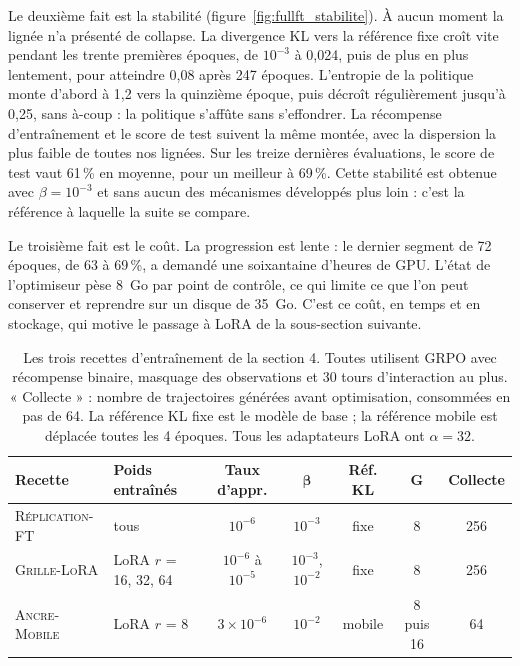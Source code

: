 \documentclass[11pt,a4paper]{article}
\begin{document}
Le deuxième fait est la stabilité (figure~\ref{fig:fullft_stabilite}). À aucun moment la lignée n'a présenté de collapse. La divergence KL vers la référence fixe croît vite pendant les trente premières époques, de $10^{-3}$ à 0{,}024, puis de plus en plus lentement, pour atteindre 0{,}08 après 247 époques. L'entropie de la politique monte d'abord à 1{,}2 vers la quinzième époque, puis décroît régulièrement jusqu'à 0{,}25, sans à-coup : la politique s'affûte sans s'effondrer. La récompense d'entraînement et le score de test suivent la même montée, avec la dispersion la plus faible de toutes nos lignées. Sur les treize dernières évaluations, le score de test vaut 61\,\% en moyenne, pour un meilleur à 69\,\%. Cette stabilité est obtenue avec $\beta = 10^{-3}$ et sans aucun des mécanismes développés plus loin : c'est la référence à laquelle la suite se compare.



Le troisième fait est le coût. La progression est lente : le dernier segment de 72 époques, de 63 à 69\,\%, a demandé une soixantaine d'heures de GPU. L'état de l'optimiseur pèse 8~Go par point de contrôle, ce qui limite ce que l'on peut conserver et reprendre sur un disque de 35~Go. C'est ce coût, en temps et en stockage, qui motive le passage à LoRA de la sous-section suivante.

\begin{table}[htbp]
\centering
\caption{Les trois recettes d'entraînement de la section 4. Toutes utilisent GRPO avec récompense binaire, masquage des observations et 30 tours d'interaction au plus. « Collecte » : nombre de trajectoires générées avant optimisation, consommées en pas de 64. La référence KL fixe est le modèle de base ; la référence mobile est déplacée toutes les 4 époques. Tous les adaptateurs LoRA ont $\alpha = 32$.}
\label{tab:hyperparams}
\footnotesize
\setlength{\tabcolsep}{4pt}
\begin{tabular}{l l c c c c c}
\toprule
\textbf{Recette} & \textbf{Poids entraînés} & \textbf{Taux d'appr.} & $\boldsymbol{\beta}$ & \textbf{Réf. KL} & $\boldsymbol{G}$ & \textbf{Collecte} \\
\midrule
\textsc{Réplication-FT} & tous & $10^{-6}$ & $10^{-3}$ & fixe & 8 & 256 \\
\textsc{Grille-LoRA} & LoRA $r$ = 16, 32, 64 & $10^{-6}$ à $10^{-5}$ & $10^{-3}$, $10^{-2}$ & fixe & 8 & 256 \\
\textsc{Ancre-Mobile} & LoRA $r$ = 8 & $3 \times 10^{-6}$ & $10^{-2}$ & mobile & 8 puis 16 & 64 \\
\bottomrule
\end{tabular}
\end{table}
\end{document}
